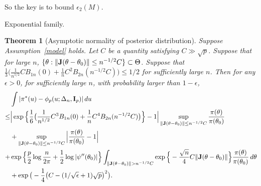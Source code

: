 \documentclass[3p]{elsarticle}
\theoremstyle{plain}
\newtheorem{theorem}{\quad\quad Theorem}
\theoremstyle{definition}
\theoremstyle{remark}
\begin{document}
So the key is to bound $\epsilon_2(M)$.


{\color{red}
Exponential family.
}
\begin{theorem}[Asymptotic normality of posterior distribution]
    Suppose Assumption~\ref{model} holds.
    Let $C$ be a quantity satisfying $C\gg \sqrt{p}$.
    Suppose that for large $n$, $\{\theta: \|\mathbf{J} (\theta-\theta_0)\|\leq n^{-1/2} C\}\subset \Theta$.
Suppose that $\frac{1}{3}\big(\frac{1}{n^{1/2}}C B_{1n}(0)+\frac{1}{n}C^2 B_{2n}(n^{-1/2}C)\big)\leq 1/2$ for sufficiently large $n$.
    Then for any $\epsilon>0$, for sufficiently large $n$, with probability larger than $1-\epsilon$, 
    $$
    \begin{aligned}
    &\int | \pi^*(u) -\phi_p(u;\Delta_n,\BI_p)| \, du\\
    \leq&
      \Big|
      \exp\Big\{\frac{1}{6}\big(
    \frac{1}{n^{1/2}}C^3 B_{1n}(0)+\frac{1}{n}C^4 B_{2n}(n^{-1/2}C)
      \big)\Big\}
        -
        1
          \Big| 
      \sup_{\|\BJ(\theta-\theta_0)\|\leq n^{-1/2} C}\frac{\pi(\theta)}{\pi(\theta_0)}\\
      &+
      \sup_{\|\BJ(\theta-\theta_0)\|\leq n^{-1/2} C}
      \Big|\frac{\pi(\theta)}{\pi(\theta_0)}-1\Big|
        \\
        +&
\exp\Big\{
    \frac{p}{2}\log \frac{n}{2\pi}+\frac{1}{2}\log |\psi''(\theta_0)|
    \Big\}
    \int_{\|\BJ(\theta-\theta_0)\|>n^{-1/2} C}
    \exp\Big\{
    -\frac{\sqrt{n}}{4} C\|\BJ(\theta-\theta_0)\|
    \Big\}
\frac{\pi(\theta)}{\pi(\theta_0)} \, d\theta\\
        &+
        \exp \big(-\frac{1}{4}\big(C-(1/\sqrt{\epsilon}+1)\sqrt{p}\big)^2 \big).
    \end{aligned}
    $$
\end{theorem}
\end{document}
